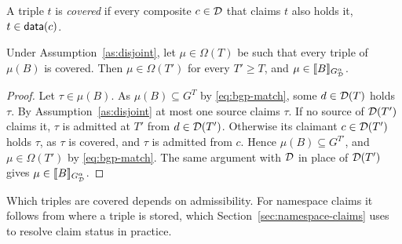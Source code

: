 \begin{definition}
\label{def:covered}
A triple $t$ is \emph{covered} if every composite $c \in \mathcal{D}$ that claims $t$ also holds
it, $t \in \mathsf{data}(c)$.
\end{definition}

\begin{lemma}
\label{lem:covered-stable}
Under Assumption~\ref{as:disjoint}, let $\mu \in \Omega(T)$ be such that every triple of
$\mu(B)$ is covered. Then $\mu \in \Omega(T')$ for every $T' \geq T$, and
$\mu \in \llbracket B \rrbracket_{G^{\alpha}_{\mathcal{D}}}$.
\end{lemma}

\begin{proof}
Let $\tau \in \mu(B)$. As $\mu(B) \subseteq G^{T}$ by \eqref{eq:bgp-match}, some
$d \in \mathcal{D}(T)$ holds $\tau$. By
Assumption~\ref{as:disjoint} at most one source claims $\tau$. If no source of
$\mathcal{D}(T')$ claims it, $\tau$ is admitted at $T'$ from $d \in \mathcal{D}(T')$. Otherwise its
claimant $c \in \mathcal{D}(T')$ holds $\tau$, as $\tau$ is covered, and $\tau$ is admitted from
$c$. Hence $\mu(B) \subseteq G^{T'}$, and $\mu \in \Omega(T')$ by
\eqref{eq:bgp-match}. The same argument with $\mathcal{D}$ in place of
$\mathcal{D}(T')$ gives $\mu \in \llbracket B \rrbracket_{G^{\alpha}_{\mathcal{D}}}$.
\end{proof}

Which triples are covered depends on admissibility. For namespace claims it follows from
where a triple is stored, which Section~\ref{sec:namespace-claims} uses to resolve claim
status in practice.